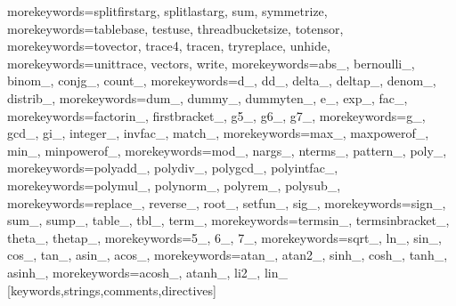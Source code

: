 {   morekeywords={splitfirstarg, splitlastarg, sum, symmetrize},
   morekeywords={tablebase, testuse, threadbucketsize, totensor},
   morekeywords={tovector, trace4, tracen, tryreplace, unhide},
   morekeywords={unittrace, vectors, write},
   morekeywords={abs_, bernoulli_, binom_, conjg_, count_},
   morekeywords={d_, dd_, delta_, deltap_, denom_, distrib_},
   morekeywords={dum_, dummy_, dummyten_, e_, exp_, fac_},
   morekeywords={factorin_, firstbracket_, g5_, g6_, g7_},
   morekeywords={g_, gcd_, gi_, integer_, invfac_, match_},
   morekeywords={max_, maxpowerof_, min_, minpowerof_},
   morekeywords={mod_, nargs_, nterms_, pattern_, poly_},
   morekeywords={polyadd_, polydiv_, polygcd_, polyintfac_},
   morekeywords={polymul_, polynorm_, polyrem_, polysub_},
   morekeywords={replace_, reverse_, root_, setfun_, sig_},
   morekeywords={sign_, sum_, sump_, table_, tbl_, term_},
   morekeywords={termsin_, termsinbracket_, theta_, thetap_},
   morekeywords={5_, 6_, 7_},
   morekeywords={sqrt_, ln_, sin_, cos_, tan_, asin_, acos_},
   morekeywords={atan_, atan2_, sinh_, cosh_, tanh_, asinh_},
   morekeywords={acosh_, atanh_, li2_, lin_}
}[keywords,strings,comments,directives]
